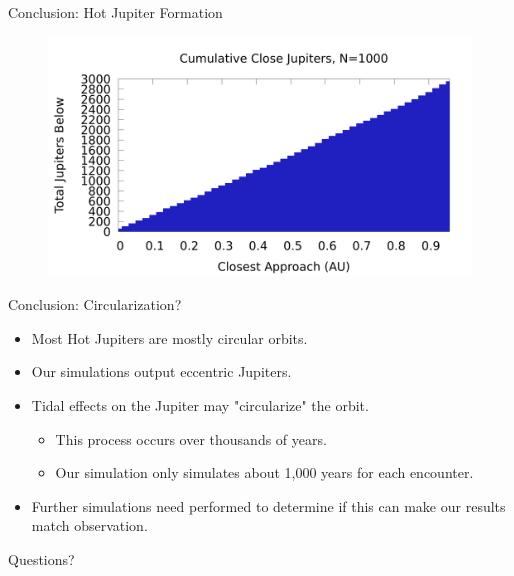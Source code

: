 \documentclass{beamer}
\begin{document}
\begin{frame}{Conclusion: Hot Jupiter Formation}
    \begin{figure}
        \centering
        \includegraphics[height=2.5in]{cumulative_jupiter_n1000.png}
    \end{figure}
\end{frame}

\begin{frame}{Conclusion: Circularization?}
    \begin{itemize}
        \item Most Hot Jupiters are mostly circular orbits.
        \item Our simulations output eccentric Jupiters.
        \item Tidal effects on the Jupiter may "circularize" the orbit.
        \begin{itemize}
            \item This process occurs over thousands of years.
            \item Our simulation only simulates about 1,000 years for each encounter.
        \end{itemize}
        \item Further simulations need performed to determine if this can make our results
            match observation.
    \end{itemize}
\end{frame}

\begin{frame}
    \Huge
    \begin{centering}
        Questions?
    \end{centering}
\end{frame}
\end{document}
